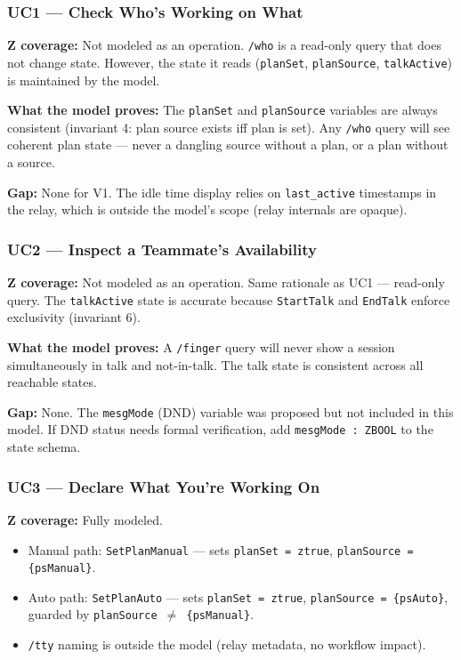 \documentclass[a4paper,10pt,fleqn]{article}
\begin{document}
\subsubsection{UC1 --- Check Who's Working on What}

\textbf{Z coverage:} Not modeled as an operation. \texttt{/who} is a
read-only query that does not change state. However, the state it reads
(\texttt{planSet}, \texttt{planSource}, \texttt{talkActive}) is maintained
by the model.

\textbf{What the model proves:} The \texttt{planSet} and
\texttt{planSource} variables are always consistent (invariant 4:
plan source exists iff plan is set). Any \texttt{/who} query will
see coherent plan state --- never a dangling source without a plan,
or a plan without a source.

\textbf{Gap:} None for V1. The idle time display relies on
\texttt{last\_active} timestamps in the relay, which is outside the
model's scope (relay internals are opaque).

\subsubsection{UC2 --- Inspect a Teammate's Availability}

\textbf{Z coverage:} Not modeled as an operation. Same rationale as UC1
--- read-only query. The \texttt{talkActive} state is accurate because
\texttt{StartTalk} and \texttt{EndTalk} enforce exclusivity (invariant 6).

\textbf{What the model proves:} A \texttt{/finger} query will never show
a session simultaneously in talk and not-in-talk. The talk state is
consistent across all reachable states.

\textbf{Gap:} None. The \texttt{mesgMode} (DND) variable was proposed
but not included in this model. If DND status needs formal verification,
add \texttt{mesgMode : ZBOOL} to the state schema.

\subsubsection{UC3 --- Declare What You're Working On}

\textbf{Z coverage:} Fully modeled.

\begin{itemize}
  \item Manual path: \texttt{SetPlanManual} --- sets \texttt{planSet = ztrue},
    \texttt{planSource = \{psManual\}}.
  \item Auto path: \texttt{SetPlanAuto} --- sets \texttt{planSet = ztrue},
    \texttt{planSource = \{psAuto\}}, guarded by
    \texttt{planSource $\neq$ \{psManual\}}.
  \item \texttt{/tty} naming is outside the model (relay metadata, no
    workflow impact).
\end{itemize}
\end{document}
